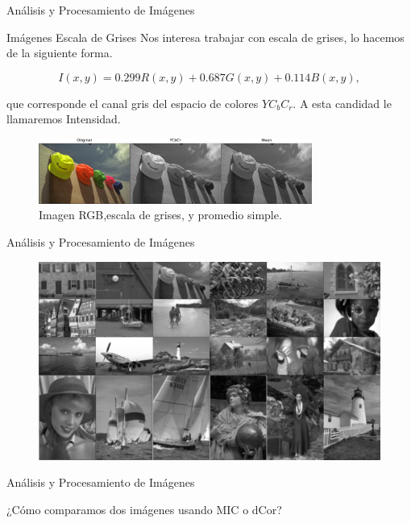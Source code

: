 \documentclass{beamer}
\begin{document}
\begin{frame}{Análisis y Procesamiento de Imágenes}
    \begin{block}{Im\'agenes Escala de Grises}
        Nos interesa trabajar con escala de grises, lo hacemos de la siguiente forma.

        \begin{equation*}
            I(x, y)=0.299 R(x, y)+0.687 G(x, y)+0.114 B(x, y), 
            \label{eq:grayscale}
        \end{equation*}

        que corresponde el canal gris del espacio de colores $YC_bC_r$. A esta candidad le llamaremos Intensidad.
    \end{block}
    \pause
    \begin{figure}[H]
        \centering
        \includegraphics[width=0.8\textwidth]{img_ex_bw.png}
        \caption{Imagen RGB,escala de grises, y promedio simple.}
    \end{figure}
\end{frame}

\begin{frame}{Análisis y Procesamiento de Imágenes}
    \begin{figure}[H]
        \centering
        \includegraphics[width=\textwidth]{all_images_grid_bw.png}
    \end{figure}     
\end{frame}

\begin{frame}{Análisis y Procesamiento de Imágenes}
    \begin{center}
        {\Large ¿Cómo comparamos dos imágenes usando MIC o dCor?}
    \end{center}
\end{frame}
\end{document}

